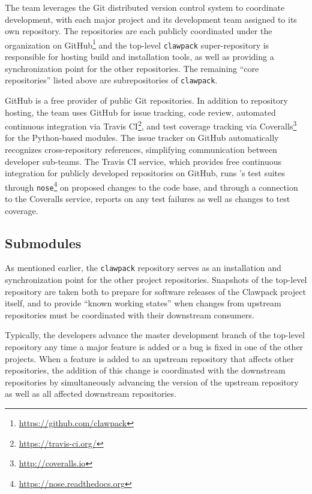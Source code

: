The \clawpack team leverages the Git distributed version control system
to coordinate development, with each major project and its development
team assigned to its own repository.  The repositories are each
publicly coordinated under the \clawpack organization on
GitHub\footnote{\url{https://github.com/clawpack}} and the
top-level \texttt{clawpack} super-repository is responsible for hosting
build and installation tools, as well as providing a synchronization
point for the other repositories.  The remaining ``core \clawpack repositories'' 
listed above are subrepositories of \texttt{clawpack}. 

GitHub is a free provider of public Git repositories.  In addition to
repository hosting, the \clawpack team uses GitHub for issue tracking,
code review, automated continuous integration via Travis CI\footnote{\url{https://travis-ci.org/}},
and test coverage tracking via Coveralls\footnote{\url{http://coveralls.io}}
for the Python-based modules.  The issue tracker on
GitHub automatically recognizes cross-repository references,
simplifying communication between \clawpack developer sub-teams.  The
Travis CI service, which provides free continuous integration for
publicly developed repositories on GitHub, runs \clawpack's test
suites through \texttt{nose}\footnote{\url{https://nose.readthedocs.org}}
on proposed changes
to the code base, and through a connection to the Coveralls service,
reports on any test failures as well as changes to test coverage.

\subsection{Submodules}

As mentioned earlier, the \texttt{clawpack} repository serves as an
installation and synchronization point for the other project repositories.
Snapshots of the top-level repository are taken both to prepare for
software releases of the Clawpack project itself, and to provide
``known working states'' when changes from upstream repositories must
be coordinated with their downstream consumers.

Typically, the \clawpack developers advance the master development
branch of the top-level repository any time a major feature is added
or a bug is fixed in one of the other projects.  When a feature is
added to an upstream repository that affects other repositories, the
addition of this change is coordinated with the downstream
repositories by simultaneously advancing the version of the upstream
repository as well as all affected downstream repositories.

